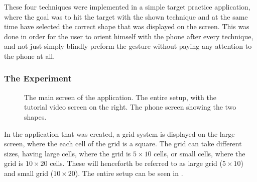 These four techniques were implemented in a simple target practice application, where the goal was to hit the target with the shown technique and at the same time have selected the correct shape that was displayed on the screen. 
This was done in order for the user to orient himself with the phone after every technique, and not just simply blindly preform the gesture without paying any attention to the phone at all.  

\subsubsection{The Experiment}

\begin{figure}[H]
	\caption{
		\protect{} The main screen of the application.
		\protect{} The entire setup, with the tutorial video screen on the right.
		\protect{} The phone screen showing the two shapes.
	}
	\label{fig:allSetup}
\end{figure}

In the application that was created, a grid system is displayed on the large screen, where the each cell of the grid is a square. 
The grid can take different sizes, having large cells, where the grid is $5 \times 10$ cells, or small cells, where the grid is $10 \times 20$ cells. 
These will henceforth be referred to as large grid ($5 \times 10$) and small grid ($10 \times 20$). The entire setup can be seen in .

